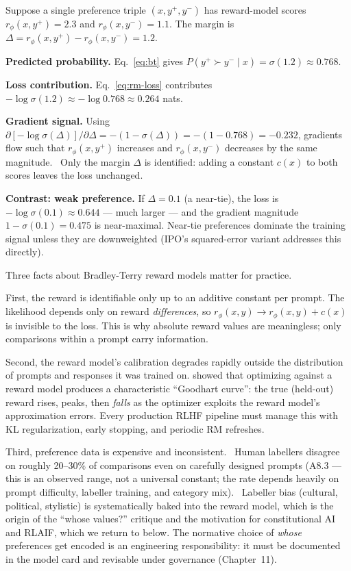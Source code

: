 \begin{workedexample}
Suppose a single preference triple $(x, y^+, y^-)$ has reward-model
scores $r_\phi(x, y^+) = 2.3$ and $r_\phi(x, y^-) = 1.1$. The
margin is $\Delta = r_\phi(x,y^+) - r_\phi(x,y^-) = 1.2$.

\textbf{Predicted probability.} Eq.~\eqref{eq:bt} gives
$P(y^+ \succ y^-\mid x) = \sigma(1.2) \approx 0.768$.

\textbf{Loss contribution.} Eq.~\eqref{eq:rm-loss} contributes
$-\log\sigma(1.2) \approx -\log 0.768 \approx 0.264$ nats.

\textbf{Gradient signal.} Using $\partial[-\log\sigma(\Delta)]/\partial\Delta
= -(1-\sigma(\Delta)) = -(1 - 0.768) = -0.232$, gradients flow such
that $r_\phi(x,y^+)$ increases and $r_\phi(x,y^-)$ decreases by the
same magnitude. \Ident\ Only the margin $\Delta$ is identified:
adding a constant $c(x)$ to both scores leaves the loss unchanged.

\textbf{Contrast: weak preference.} If $\Delta = 0.1$ (a near-tie),
the loss is $-\log\sigma(0.1) \approx 0.644$ --- much larger ---
and the gradient magnitude $1-\sigma(0.1) = 0.475$ is near-maximal.
Near-tie preferences dominate the training signal unless they are
downweighted (IPO's squared-error variant addresses this directly).
\end{workedexample}

Three facts about Bradley-Terry reward models matter for practice.

First, the reward is identifiable only up to an additive constant
per prompt. The likelihood depends only on reward \emph{differences},
so $r_\phi(x, y) \to r_\phi(x, y) + c(x)$ is invisible to the loss.
This is why absolute reward values are meaningless; only
comparisons within a prompt carry information.

Second, the reward model's calibration degrades rapidly outside the
distribution of prompts and responses it was trained on.
\citet{gao2023scaling} showed that optimizing against a reward
model produces a characteristic ``Goodhart curve'': the true
(held-out) reward rises, peaks, then \emph{falls} as the optimizer
exploits the reward model's approximation errors. Every production
RLHF pipeline must manage this with KL regularization, early
stopping, and periodic RM refreshes.

Third, preference data is expensive and inconsistent. \Emp\ Human
labellers disagree on roughly 20--30\% of comparisons even on
carefully designed prompts (A8.3 --- this is an observed range, not
a universal constant; the rate depends heavily on prompt
difficulty, labeller training, and category mix). \Norm\ Labeller
bias (cultural, political, stylistic) is systematically baked into
the reward model, which is the origin of the ``whose values?''
critique and the motivation for constitutional AI and RLAIF, which
we return to below. The normative choice of \emph{whose}
preferences get encoded is an engineering responsibility: it must be
documented in the model card and revisable under governance
(Chapter~11).


